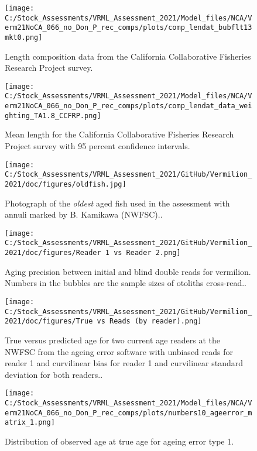 \documentclass[11pt,
  english,
  a4paper,
]{article}
\begin{document}
\begin{figure}
\centering
\texttt{[image: C:/Stock\_Assessments/VRML\_Assessment\_2021/Model\_files/NCA/Verm21NoCA\_066\_no\_Don\_P\_rec\_comps/plots/comp\_lendat\_bubflt13mkt0.png]}
\caption{Length composition data from the California Collaborative Fisheries Research Project survey.\label{fig:len-data-CCFRP}}
\end{figure}

\begin{figure}
\centering
\texttt{[image: C:/Stock\_Assessments/VRML\_Assessment\_2021/Model\_files/NCA/Verm21NoCA\_066\_no\_Don\_P\_rec\_comps/plots/comp\_lendat\_data\_weighting\_TA1.8\_CCFRP.png]}
\caption{Mean length for the California Collaborative Fisheries Research Project survey with 95 percent confidence intervals.\label{fig:mean-com-len-data-CCFRP}}
\end{figure}

\begin{figure}
\centering
\texttt{[image: C:/Stock\_Assessments/VRML\_Assessment\_2021/GitHub/Vermilion\_2021/doc/figures/oldfish.jpg]}
\caption{Photograph of the \emph{oldest} aged fish used in the assessment with annuli marked by B. Kamikawa (NWFSC)..\label{fig:oldfish}}
\end{figure}

\begin{figure}
\centering
\texttt{[image: C:/Stock\_Assessments/VRML\_Assessment\_2021/GitHub/Vermilion\_2021/doc/figures/Reader 1 vs Reader 2.png]}
\caption{Aging precision between initial and blind double reads for vermilion. Numbers in the bubbles are the sample sizes of otoliths cross-read..\label{fig:reader1reader2}}
\end{figure}

\begin{figure}
\centering
\texttt{[image: C:/Stock\_Assessments/VRML\_Assessment\_2021/GitHub/Vermilion\_2021/doc/figures/True vs Reads (by reader).png]}
\caption{True versus predicted age for two current age readers at the NWFSC from the ageing error software with unbiased reads for reader 1 and curvilinear bias for reader 1 and curvilinear standard deviation for both readers..\label{fig:truereads}}
\end{figure}

\begin{figure}
\centering
\texttt{[image: C:/Stock\_Assessments/VRML\_Assessment\_2021/Model\_files/NCA/Verm21NoCA\_066\_no\_Don\_P\_rec\_comps/plots/numbers10\_ageerror\_matrix\_1.png]}
\caption{Distribution of observed age at true age for ageing error type 1.\label{fig:ageerror}}
\end{figure}
\end{document}
